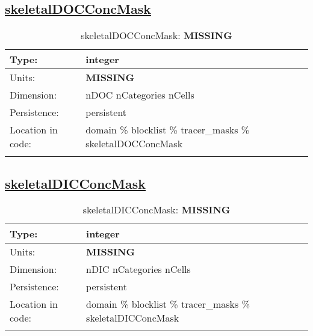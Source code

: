 \subsection[skeletalDOCConcMask]{\hyperref[sec:var_tab_tracer_masks]{skeletalDOCConcMask}}
\label{subsec:var_sec_tracer_masks_skeletalDOCConcMask}
\begin{center}
\begin{longtable}{| p{2.0in} | p{4.0in} |}
        \hline 
        Type: & integer \\
        \hline 
        Units: & {\bf \color{red} MISSING} \\
        \hline 
        Dimension: & nDOC nCategories nCells \\
        \hline 
        Persistence: & persistent \\
        \hline 
         Location in code: & domain \% blocklist \% tracer\_masks \% skeletalDOCConcMask \\
         \hline 
    \caption{skeletalDOCConcMask: {\bf \color{red} MISSING}}
\end{longtable}
\end{center}
\subsection[skeletalDICConcMask]{\hyperref[sec:var_tab_tracer_masks]{skeletalDICConcMask}}
\label{subsec:var_sec_tracer_masks_skeletalDICConcMask}
\begin{center}
\begin{longtable}{| p{2.0in} | p{4.0in} |}
        \hline 
        Type: & integer \\
        \hline 
        Units: & {\bf \color{red} MISSING} \\
        \hline 
        Dimension: & nDIC nCategories nCells \\
        \hline 
        Persistence: & persistent \\
        \hline 
         Location in code: & domain \% blocklist \% tracer\_masks \% skeletalDICConcMask \\
         \hline 
    \caption{skeletalDICConcMask: {\bf \color{red} MISSING}}
\end{longtable}
\end{center}
